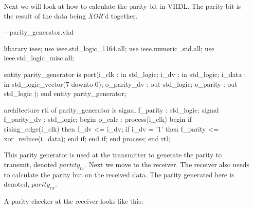 Next we will look at how to calculate the parity bit in \ac{VHDL}. The parity bit is the result of the data being \emph{XOR}'d together.

\begin{VHDLlisting}[tabsize=4]
-- parity_generator.vhd

libarary ieee;
    use ieee.std_logic_1164.all;
    use ieee.numeric_std.all;
    use ieee.std_logic_misc.all;
	
entity parity_generator is
    port(i_clk       : in    std_logic;
         i_dv        : in    std_logic;
         i_data      : in    std_logic_vector(7 downto 0);
         o_parity_dv :   out std_logic;
         o_parity    :   out std_logic
    );
end entity parity_generator;

architecture rtl of parity_generator is
    signal f_parity    : std_logic;
    signal f_parity_dv : std_logic;
begin
    p_calc : process(i_clk)
    begin
        if rising_edge(i_clk) then
            f_dv <= i_dv;
            if i_dv = '1' then
                f_parity <= xor_reduce(i_data);
            end if;
        end if;	
    end process;
end rtl;
\end{VHDLlisting}

This parity generator is used at the transmitter to generate the parity to transmit, denoted $partity_{tx}$. Next we move to the receiver. The receiver also needs to calculate the parity but on the received data. The parity generated here is denoted, $parity_{rx}$.

A parity checker at the receiver looks like this:

